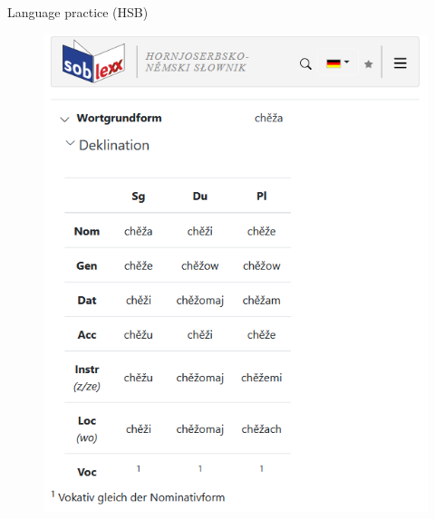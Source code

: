 \begin{block}{Language practice (HSB)}
    \begin{figure}
        \centering
        \includegraphics[width=0.7\colwidth]{05_z_02_soblex_klein.png}
        \label{fig:soblex}
    \end{figure}

  \end{block}
